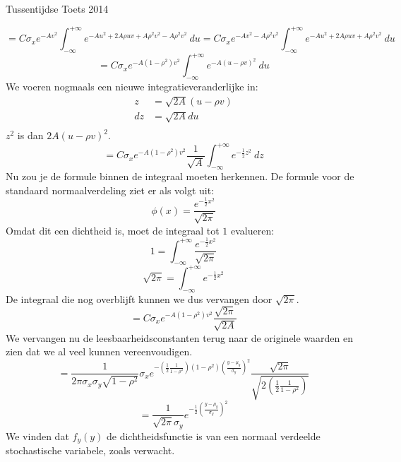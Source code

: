 \documentclass[main.tex]{subfiles}
\begin{document}
\begin{examenvraag}{Tussentijdse Toets 2014}
\begin{ex-antwoord}
\[    = C\sigma_{x}e^{-Av^{2}}\int_{-\infty}^{+\infty}e^{-Au^{2}+2A\rho u v + A\rho^{2}v^{2} - A\rho^{2}v^{2}}\ du 
    = C\sigma_{x}e^{-Av^{2}-A\rho^{2}v^{2}}\int_{-\infty}^{+\infty}e^{-Au^{2}+2A\rho u v + A\rho^{2}v^{2}}\ du 
    \]
    \[
    = C\sigma_{x}e^{-A(1-\rho^{2})v^{2}}\int_{-\infty}^{+\infty}e^{-A(u-\rho v)^{2}}\ du 
    \]
    We voeren nogmaals een nieuwe integratieveranderlijke in:
    \[ 
    \begin{array}{rl}
      z &= \sqrt{2A}(u-\rho v) \\
      dz &= \sqrt{2A} du\\
    \end{array}
    \]
    $z^{2}$ is dan $2A(u-\rho v)^{2}$.
    \[
    = C\sigma_{x}e^{-A(1-\rho^{2})v^{2}}\frac{1}{\sqrt{A}}\int_{-\infty}^{+\infty}e^{-\frac{1}{2}z^{2}}\ dz
    \]
    Nu zou je de formule binnen de integraal moeten herkennen.
    De formule voor de standaard normaalverdeling ziet er als volgt uit:
    \[ \phi(x) = \frac{e^{-\frac{1}{2}x^{2}}}{\sqrt{2\pi}} \]
    Omdat dit een dichtheid is, moet de integraal tot $1$ evalueren:
    \[ 1 = \int_{-\infty}^{+\infty}\frac{e^{-\frac{1}{2}x^{2}}}{\sqrt{2\pi}} \]
    \[ \sqrt{2\pi} = \int_{-\infty}^{+\infty}e^{-\frac{1}{2}x^{2}} \]
    De integraal die nog overblijft kunnen we dus vervangen door $\sqrt{2\pi}$.
    \[
    = C\sigma_{x}e^{-A(1-\rho^{2})v^{2}}\frac{\sqrt{2\pi}}{\sqrt{2A}}
    \]
    We vervangen nu de leesbaarheidsconstanten terug naar de originele waarden en zien dat we al veel kunnen vereenvoudigen.
    \[
    = \dfrac{1}{2\pi\sigma_{x}\sigma_{y}\sqrt{1-\rho^{2}}}\sigma_{x}e^{-\left( \frac{1}{2}\frac{1}{1-\rho^{2}}\right)(1-\rho^{2})\left(\frac{y-\mu_{y}}{\sigma_{y}}\right)^{2}}\frac{\sqrt{2\pi}}{\sqrt{2\left( \frac{1}{2}\frac{1}{1-\rho^{2}}\right)}}
    \]
    \[
    = \dfrac{1}{\sqrt{2\pi}\sigma_{y}}e^{- \frac{1}{2}\left(\frac{y-\mu_{y}}{\sigma_{y}}\right)^{2}}
    \]
    We vinden dat $f_{y}(y)$ de dichtheidsfunctie is van een normaal verdeelde stochastische variabele, zoals verwacht.
  \end{ex-antwoord}
\end{examenvraag}
\end{document}
